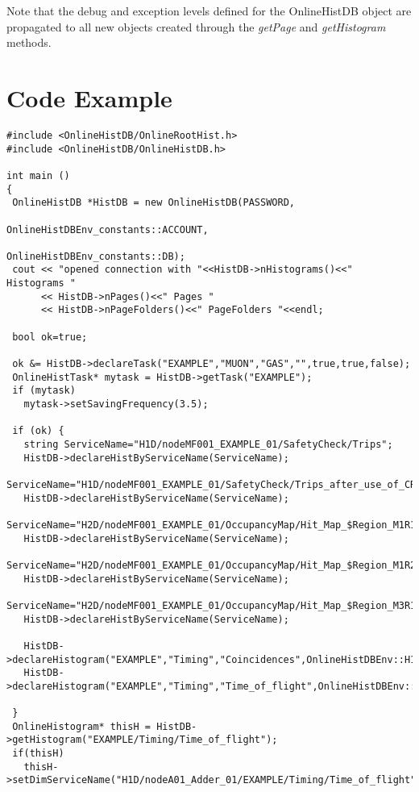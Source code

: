 \documentclass{lhcbnote}
\begin{document}
Note that the debug and exception levels defined for the OnlineHistDB object are
propagated to all new objects created through the {\it getPage} and
{\it getHistogram} methods.



\section{Code Example}

\begin{verbatim}
#include <OnlineHistDB/OnlineRootHist.h>
#include <OnlineHistDB/OnlineHistDB.h>

int main ()
{
 OnlineHistDB *HistDB = new OnlineHistDB(PASSWORD,
                                        OnlineHistDBEnv_constants::ACCOUNT,
                                        OnlineHistDBEnv_constants::DB);
 cout << "opened connection with "<<HistDB->nHistograms()<<" Histograms "
      << HistDB->nPages()<<" Pages "
      << HistDB->nPageFolders()<<" PageFolders "<<endl;
    
 bool ok=true;
  
 ok &= HistDB->declareTask("EXAMPLE","MUON","GAS","",true,true,false);
 OnlineHistTask* mytask = HistDB->getTask("EXAMPLE");
 if (mytask)
   mytask->setSavingFrequency(3.5);
  
 if (ok) {
   string ServiceName="H1D/nodeMF001_EXAMPLE_01/SafetyCheck/Trips";
   HistDB->declareHistByServiceName(ServiceName);
   ServiceName="H1D/nodeMF001_EXAMPLE_01/SafetyCheck/Trips_after_use_of_CRack";
   HistDB->declareHistByServiceName(ServiceName);
   ServiceName="H2D/nodeMF001_EXAMPLE_01/OccupancyMap/Hit_Map_$Region_M1R1";
   HistDB->declareHistByServiceName(ServiceName); 
   ServiceName="H2D/nodeMF001_EXAMPLE_01/OccupancyMap/Hit_Map_$Region_M1R2";
   HistDB->declareHistByServiceName(ServiceName);
   ServiceName="H2D/nodeMF001_EXAMPLE_01/OccupancyMap/Hit_Map_$Region_M3R1";
   HistDB->declareHistByServiceName(ServiceName);
   
   HistDB->declareHistogram("EXAMPLE","Timing","Coincidences",OnlineHistDBEnv::H1D);
   HistDB->declareHistogram("EXAMPLE","Timing","Time_of_flight",OnlineHistDBEnv::H1D);
   
 }
 OnlineHistogram* thisH = HistDB->getHistogram("EXAMPLE/Timing/Time_of_flight");
 if(thisH)
   thisH->setDimServiceName("H1D/nodeA01_Adder_01/EXAMPLE/Timing/Time_of_flight");
\end{verbatim}
\end{document}
